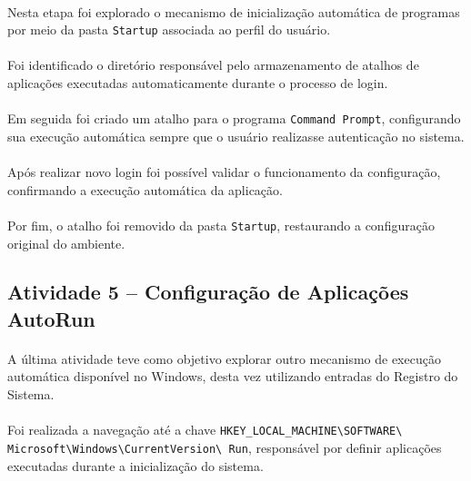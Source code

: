 \paragraph{}
Nesta etapa foi explorado o mecanismo de inicialização automática de programas
por meio da pasta \texttt{Startup} associada ao perfil do usuário.

\paragraph{}
Foi identificado o diretório responsável pelo armazenamento de atalhos de
aplicações executadas automaticamente durante o processo de login.

\paragraph{}
Em seguida foi criado um atalho para o programa \texttt{Command Prompt},
configurando sua execução automática sempre que o usuário realizasse
autenticação no sistema.

\paragraph{}
Após realizar novo login foi possível validar o funcionamento da configuração,
confirmando a execução automática da aplicação.

\paragraph{}
Por fim, o atalho foi removido da pasta \texttt{Startup}, restaurando a
configuração original do ambiente.

\subsection{Atividade 5 -- Configuração de Aplicações AutoRun}

\paragraph{}
A última atividade teve como objetivo explorar outro mecanismo de execução
automática disponível no Windows, desta vez utilizando entradas do Registro do
Sistema.

\paragraph{}
Foi realizada a navegação até a chave
\texttt{HKEY\_LOCAL\_MACHINE\textbackslash SOFTWARE\textbackslash
Microsoft\textbackslash Windows\textbackslash CurrentVersion\textbackslash
Run}, responsável por definir aplicações executadas durante a inicialização do
sistema.

